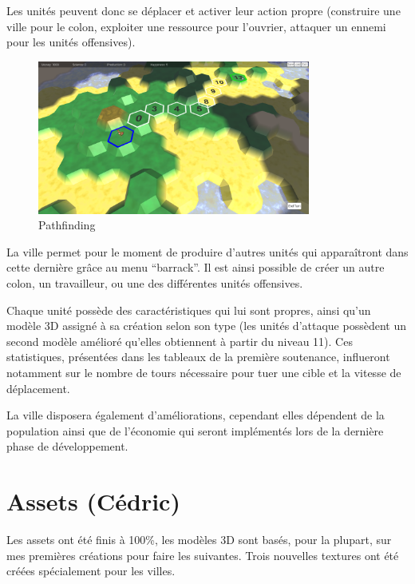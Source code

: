 \documentclass[12pt]{report}
\begin{document}
Les unités peuvent donc se déplacer et activer leur action propre (construire
une ville pour le colon, exploiter une ressource pour l'ouvrier, attaquer un 
ennemi pour les unités offensives).

\begin{figure}[H]
    \centering
    \includegraphics[width=0.8\textwidth]{Pathfinding}
    \caption{Pathfinding}
\end{figure}

La ville permet pour le moment de produire d’autres unités qui apparaîtront
dans cette dernière grâce au menu “barrack”. Il est ainsi possible de créer un
autre colon, un travailleur, ou une des différentes unités offensives.

Chaque unité possède des caractéristiques qui lui sont propres, ainsi qu’un
modèle 3D assigné à sa création selon son type (les unités d’attaque possèdent
un second modèle amélioré qu’elles obtiennent à partir du niveau 11). Ces
statistiques, présentées dans les tableaux de la première soutenance,
influeront notamment sur le nombre de tours nécessaire pour tuer une cible et
la vitesse de déplacement.

La ville disposera également d’améliorations, cependant elles dépendent de la
population ainsi que de l’économie qui seront implémentés lors de la dernière
phase de développement.

\newpage

\section{Assets (Cédric)}

Les assets ont été finis à 100\%, les modèles 3D sont basés, pour la plupart,
sur mes premières créations pour faire les suivantes. Trois nouvelles textures
ont été créées spécialement pour les villes.
\end{document}
